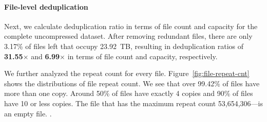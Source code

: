 \paragraph{File-level deduplication}
%
Next, we calculate deduplication ratio in terms of file count and capacity for
the complete uncompressed dataset.
%
After removing redundant files, there are only 3.17\% of files left that occupy
23.92~TB, resulting in deduplication ratios of \textbf{31.55$\times$} and
\textbf{6.99$\times$} in terms of file count and capacity, respectively.
%

%
We further analyzed the repeat count for every file.
%
Figure~\ref{fig:file-repeat-cnt} shows the distributions of file repeat count.  
%
We see that over 99.42\% of files have more than one copy.
%
Around 50\% of files have exactly 4 copies and 90\% of files have 10 or less
copies. 
%
The file that has the maximum repeat count 53,654,306---is an empty file.
%
.
%
